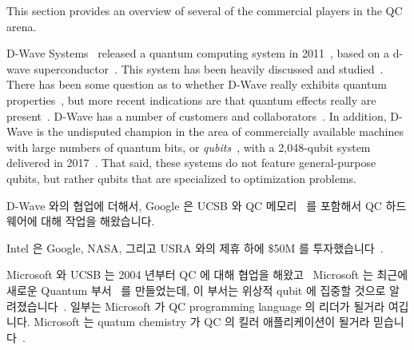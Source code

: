 This section provides an overview of several of the commercial
players in the QC arena.

D-Wave Systems~\cite{D-WaveSystemsHomePage}
released a quantum computing system
in 2011~\cite{WikipediaD-WaveSystems}, based on a d-wave
superconductor~\cite{MHSAmin2000D-Wave-superconductor}.
This system has been heavily discussed and
studied~\cite{KamranKarimi2011D-WaveAdiabatic}.
There has been some question as to whether D-Wave really exhibits quantum
properties~\cite{SeungWooShin2014IsDwaveQuantum}, but more recent
indications are that quantum effects really are
present~\cite{PhysRevA.91.042314,PhysRevX.4.021041}.
D-Wave has a number of customers and
collaborators~\cite{JeffreyBurt2014Google-QC-Chip,PatrickHarris2015QC-Google-NASA-DWave,ToddRWeiss2013Google-QC-AI-Lab}.
In addition, D-Wave is the undisputed champion in the area of commercially
available machines with large numbers of quantum bits, or
\emph{qubits}~\cite{WikipediaD-WaveSystems},
with a 2,048-qubit system delivered in
2017~\cite{AgamShah2016D-Wave-2000-qubit,BradJones2017D-Wave2000Sale}.
That said, these systems do not feature general-purpose qubits, but
rather qubits that are specialized to optimization problems.
\fi

D-Wave 와의 협업에 더해서, Google 은 UCSB 와 QC
메모리~\cite{JaikumarVijayan2015Google-UCSB-QC-Memory} 를 포함해서 QC
하드웨어에 대해 작업을 해왔습니다.

Intel 은 Google, NASA, 그리고 USRA 와의 제휴 하에 \$50M 를
투자했습니다~\cite{StaceyHigginbotham2015Intel-QC-invest-50M}.

Microsoft 와 UCSB 는 2004 년부터 QC 에 대해 협업을
해왔고~\cite{PedroHernandez2014MicrosoftStationQ-QC} Microsoft 는 최근에 새로운
Quantum 부서~\cite{PedroHernandez2016Microsoft-QC} 를 만들었는데, 이 부서는
위상적 qubit 에 집중할 것으로
알려졌습니다~\cite{PeterBright2018UsoftTopoQubit,WikipediaTopologicalQuantumComputer}.
일부는 Microsoft 가 QC programming language 의 리더가 될거라 여깁니다.
Microsoft 는 quatum chemistry 가 QC 의 킬러 애플리케이션이 될거라
믿습니다~\cite{TomSimonite2017QC-MS-Chemistry}.

